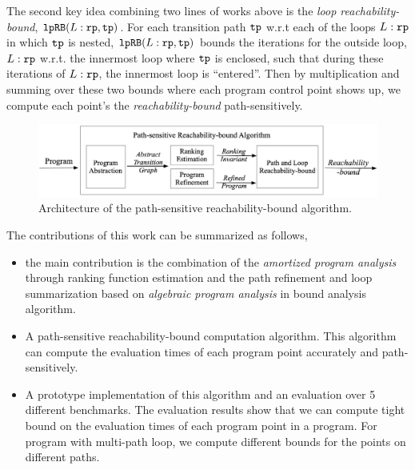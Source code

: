 The second key idea combining two lines of works above is the \emph{loop reachability-bound}, $\mathtt{lpRB}(L:\mathtt{rp}, \mathtt{tp})$.
For each transition path $\mathtt{tp}$ w.r.t each of the loops $L:\mathtt{rp}$ in which $\mathtt{tp}$ is nested,
$\mathtt{lpRB}(L:\mathtt{rp}, \mathtt{tp})$ bounds the iterations for
the outside loop, $L:\mathtt{rp}$ w.r.t. the innermost loop where $\mathtt{tp}$ is enclosed,
such that during these iterations of $L:\mathtt{rp}$, the innermost loop is ``entered''. 
Then by multiplication and summing over these two bounds where each program control point shows up, we compute each point's the \emph{reachability-bound} path-sensitively.
\begin{figure}
\centering
\includegraphics[width=1.0\columnwidth]{psRB-architecture.png}
\caption{Architecture of the path-sensitive reachability-bound algorithm.}
\label{fig:psRB-architecture}
\end{figure}
The contributions of this work can be summarized as follows,
\begin{itemize}
  \item the main contribution is the combination of the \emph{amortized program analysis} through ranking function estimation and the path refinement and loop summarization based on \emph{algebraic program analysis} in bound analysis algorithm.
  \item A path-sensitive reachability-bound computation algorithm.
  This algorithm can compute the evaluation times of each program point accurately and path-sensitively.
  \item A prototype implementation of this algorithm and an evaluation over 5 different benchmarks.
  The evaluation results show that we can compute tight bound on the evaluation times of each program point in a program. For program with multi-path loop, we compute different bounds for the points on different paths.
\end{itemize}